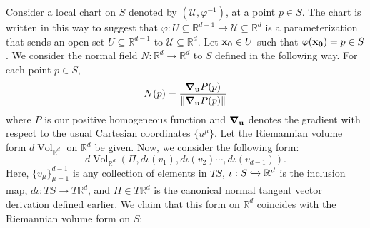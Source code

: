 \documentclass{article}
\renewcommand\det{\operatorname{det}}
\newcommand{\R}{\mathbb{R}}
\newcommand{\f}[2]{\frac{#1}{#2}}
\theoremstyle{theorem}
\newcommand{\Vol}{\operatorname{Vol}}
\begin{document}
Consider a local chart on $S$ denoted by $(\mathcal{U}, \varphi^{-1})$, at a point $p\in S$. The chart is written in this way to suggest that $\varphi: U \subseteq \R^{d-1} \to \mathcal{U} \subseteq \R^d$ is a parameterization that sends an open set $U\subseteq \R^{d-1}$ to $\mathcal{U}\subseteq \R^d$. Let ${\bf{x_0}}\in U$ such that $\varphi({\bf{x_0}}) = p\in S$. We consider the normal field $N : \R^d \to \R^d$ to $S$ defined in the following way. For each point $p \in S$, 
\begin{equation*}
    N(p) = \f{\grad_{\bf{u}} P(p)}{\norm{\grad_{\bf{u}} P(p)}}
\end{equation*}
where $P$ is our positive homogeneous function and $\grad_{\bf{u}}$ denotes the gradient with respect to the usual Cartesian coordinates $\{u^\mu\}$. Let the Riemannian volume form $d\Vol_{\R^d}$ on $\R^d$ be given. Now, we consider the following form:
\begin{equation*}
d\Vol_{\mathbb{R}^d} (\Pi, d\iota(v_1),d\iota(v_2)\cdots,d\iota(v_{d-1})).
\end{equation*}
Here, $\{ v_\mu \}_{\mu = 1}^{d-1}$ is any collection of elements in $TS$, $\iota: S\xhookrightarrow{} \R^d$ is the inclusion map,  $d\iota : TS \to T\R^d$, and $\Pi\in T\mathbb{R}^d$ is the canonical normal tangent vector derivation defined earlier. We claim that this form on $\R^d$ coincides with the Riemannian volume form on $S$:
\end{document}
